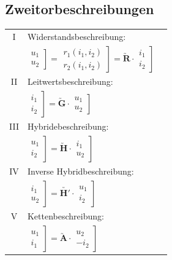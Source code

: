 \documentclass[6pt,a4paper]{scrartcl}
\newcommand{\ma}[1]{\ensuremath{\utilde{\boldsymbol {#1}}}}
\begin{document}
\begin{multicols}{3}
	\subsection{Zweitorbeschreibungen}
	\begin{tabular}{cll}
	I & Widerstandsbeschreibung:\\
	& $\left.\begin{matrix} u_1\\ u_2\end{matrix}\right]=\left.\begin{matrix} r_1(i_1,i_2)\\ r_2(i_1,i_2) \end{matrix}\right] = \ma{R} \cdot \left.\begin{matrix} i_1\\ i_2 \end{matrix}\right]$\\
	II & Leitwertsbeschreibung:\\
	& $\left.\begin{matrix} i_1\\ i_2\end{matrix}\right]=\ma{G} \cdot \left.\begin{matrix} u_1\\ u_2 \end{matrix}\right]$\\
	III & Hybridebeschreibung:\\
	& $\left.\begin{matrix} u_1\\ i_2\end{matrix}\right]=\ma{H} \cdot \left.\begin{matrix} i_1\\ u_2 \end{matrix}\right]$\\
	IV & Inverse Hybridbeschreibung:\\
	& $\left.\begin{matrix} i_1\\ u_2\end{matrix}\right]=\ma{H'} \cdot \left.\begin{matrix} u_1\\ i_2 \end{matrix}\right]$\\
	V & Kettenbeschreibung:\\
	& $\left.\begin{matrix} u_1\\ i_1\end{matrix}\right]=\ma{A} \cdot \left.\begin{matrix} u_2\\ -i_2 \end{matrix}\right]$\\

\end{tabular}
\end{multicols}
\end{document}
